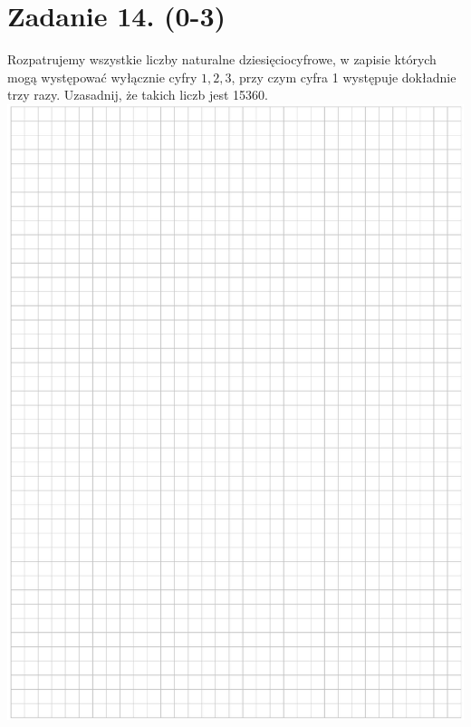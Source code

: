 \documentclass[10pt]{article}
\begin{document}
\section*{Zadanie 14. (0-3)}
Rozpatrujemy wszystkie liczby naturalne dziesięciocyfrowe, w zapisie których mogą występować wyłącznie cyfry \(1,2,3\), przy czym cyfra 1 występuje dokładnie trzy razy. Uzasadnij, że takich liczb jest 15360.\\
\includegraphics[max width=\textwidth, center]{2024_11_21_054c332d5c02f869c372g-16}\\
\end{document}

